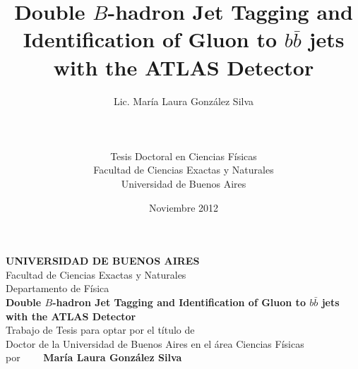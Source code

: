 \documentclass[11pt,a4paper,12pt]{report}
\title{Double $B$-hadron Jet Tagging and Identification of Gluon to $b \bar{b}$ jets with the ATLAS Detector}
\author{Lic. Mar\'ia Laura Gonz\'alez Silva \\ \\ \\ \\Tesis Doctoral en Ciencias F\'isicas\\Facultad de Ciencias Exactas y Naturales\\Universidad de Buenos Aires}
\date{Noviembre 2012}
\begin{document}
\maketitle


\newpage

\thispagestyle{empty}
\begin{figure}[h]
  \begin{center}
  \end{center}
\end{figure}

\begin{center}
  {\bfseries UNIVERSIDAD DE BUENOS AIRES}\\
  \vspace{0.5cm}
  Facultad de Ciencias Exactas y Naturales\\
  \vspace{0.5cm}
  Departamento de F\'isica\\
  \vspace{1.5cm}
         {\large {\bfseries Double $B$-hadron Jet Tagging and Identification of Gluon to $b \bar{b}$ jets with the ATLAS Detector}}\\
         \vspace{1.5cm}
         Trabajo de Tesis para optar por el t\'itulo de \\
         Doctor de la Universidad de Buenos Aires en el \'area Ciencias F\'isicas\\
         \vspace{1.5cm}
         por $\qquad ${\bfseries Mar\'ia Laura Gonz\'alez Silva}\\
         \vspace{1.5cm}
\end{center}
\end{document}
